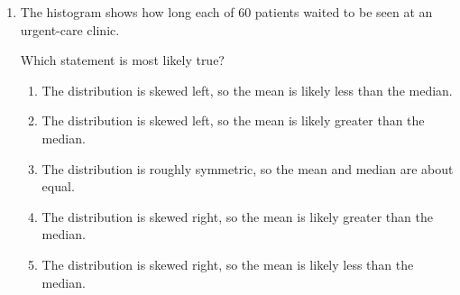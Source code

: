 \documentclass[12pt]{article}
\begin{document}
\begin{enumerate}[leftmargin=1.9em, itemsep=0.13in]
        What is the \textbf{interquartile range} of the points scored?\hfill{}\rule[-0.2in]{0pt}{0.48in}
        \par\vspace{3pt}\noindent
        \hspace{1.2em}\textbf{(A)} 16 \hfill \textbf{(B)} 19 \hfill
        \textbf{(C)} 24 \hfill \textbf{(D)} 38 \hfill \textbf{(E)} 63

  \boxguard[18]
  \item The histogram shows how long each of 60 patients waited to be seen at an urgent-care
        clinic.

        \vspace{3pt}
        {\centering
        \par}
        \vspace{1pt}

        Which statement is most likely true?\hfill{}\rule[-0.2in]{0pt}{0.48in}
        \begin{enumerate}[label=\textbf{(\Alph*)}, leftmargin=2.2em, itemsep=2pt]
          \item The distribution is skewed left, so the mean is likely less than the median.
          \item The distribution is skewed left, so the mean is likely greater than the median.
          \item The distribution is roughly symmetric, so the mean and median are about equal.
          \item The distribution is skewed right, so the mean is likely greater than the median.
          \item The distribution is skewed right, so the mean is likely less than the median.
        \end{enumerate}


\end{enumerate}
\end{document}
